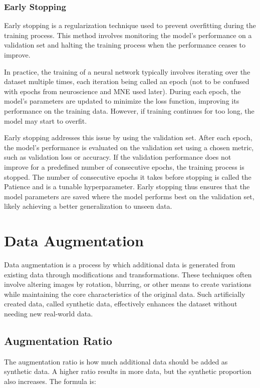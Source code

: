 \subsubsection{Early Stopping}
\label{subsec: early_stopping}
Early stopping is a regularization technique used to prevent overfitting during the training process. This method involves monitoring the model's performance on a validation set and halting the training process when the performance ceases to improve.

In practice, the training of a neural network typically involves iterating over the dataset multiple times, each iteration being called an epoch (not to be confused with epochs from neuroscience and MNE used later). During each epoch, the model's parameters are updated to minimize the loss function, improving its performance on the training data. However, if training continues for too long, the model may start to overfit.

Early stopping addresses this issue by using the validation set. After each epoch, the model's performance is evaluated on the validation set using a chosen metric, such as validation loss or accuracy. If the validation performance does not improve for a predefined number of consecutive epochs, the training process is stopped. The number of consecutive epochs it takes before stopping is called the Patience and is a tunable hyperparameter. Early stopping thus ensures that the model parameters are saved where the model performs best on the validation set, likely achieving a better generalization to unseen data.

\section{Data Augmentation}
Data augmentation is a process by which additional data is generated from existing data through modifications and transformations. These techniques often involve altering images by rotation, blurring, or other means to create variations while maintaining the core characteristics of the original data. Such artificially created data, called synthetic data, effectively enhances the dataset without needing new real-world data\cite{wang2024comprehensive}.
\subsection{Augmentation Ratio}
\label{subsec: augmentation_ratio}
The augmentation ratio is how much additional data should be added as synthetic data. A higher ratio results in more data, but the synthetic proportion also increases. The formula is: 

